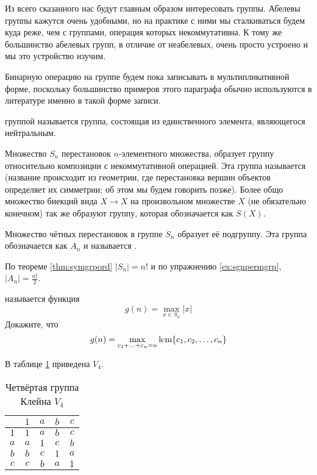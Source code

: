 Из всего сказанного нас будут главным образом интересовать группы. Абелевы группы кажутся очень удобными, но на практике с ними мы сталкиваться будем куда реже, чем с группами, операция которых некоммутативна. К тому же большинство абелевых групп, в отличие от неабелевых, очень просто устроено и мы это устройство изучим.

Бинарную операцию на группе будем пока записывать в мультипликативной форме, поскольку большинство примеров этого параграфа обычно используются в литературе именно в такой форме записи.

\begin{example}
	 группой называется группа, состоящая из единственного элемента, являющегося нейтральным.
\end{example}

\begin{example}
	Множество $S_n$ перестановок $n$-элементного множества, образует группу относительно композиции с некоммутативной операцией. Эта группа называется  (название происходит из геометрии, где перестановка вершин объектов определяет их симметрии; об этом мы будем говорить позже). Более общо множество биекций вида $X\to X$ на произвольном множестве $X$ (не обязательно конечном) так же образуют группу, которая обозначается как $S(X)$.
\end{example}

\begin{example}
	Множество чётных перестановок в группе $S_n$ образует её подгруппу. Эта группа обозначается как $A_n$ и называется .
\end{example}

\begin{example}
	По теореме \ref{thm:symgrpord} $|S_n| = n!$ и по упражнению \ref{ex:sgnpermgrp}, $|A_n| = \frac{n!}{2}$.
\end{example}

\begin{exercise}
	 называется функция
	\[
	g(n) = \max_{x\in S_n} |x|
	\]
	Докажите, что
	\[
	g(n) = \max_{c_1+\ldots+c_n = n} \operatorname{lcm}\{c_1, c_2, \ldots, c_n\}
	\]
\end{exercise}

\begin{example}
	В таблице \ref{tb:v4} приведена  $V_4$.
\end{example}

\begin{table}[h]
	\centering
	\begin{tabular}{c|cccc}
		& $1$ & $a$ & $b$ & $c$ \\ 
		\hline $1$ & $1$ & $a$ & $b$ & $c$ \\ 
		$a$ & $a$ & $1$ & $c$ & $b$ \\ 
		$b$ & $b$ & $c$ & $1$ & $a$ \\ 
		$c$ & $c$ & $b$ & $a$ & $1$ \\ 
	\end{tabular}
	\caption{Четвёртая группа Клейна $V_4$}\label{tb:v4}
\end{table}

